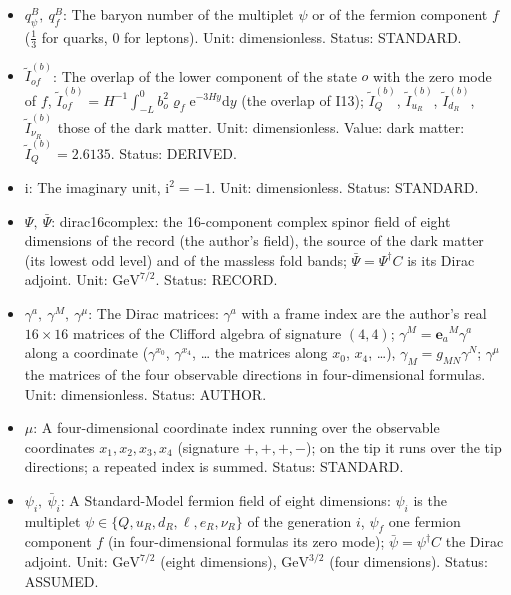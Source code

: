 \documentclass[
  10pt,
]{article}
\begin{document}
\begin{itemize}
  GeV\(^{-2}\) (dark-matter relic density). Status: DERIVED.
\item
  \(q^B_\psi,\ q^B_f\): The baryon number of the multiplet \(\psi\) or
  of the fermion component \(f\) (\(\frac13\) for quarks, 0 for
  leptons). Unit: dimensionless. Status: STANDARD.
\item
  \(\tilde I^{(b)}_{of}\): The overlap of the lower component of the
  state \(o\) with the zero mode of \(f\),
  \(\tilde I^{(b)}_{of} = H^{-1}\int_{-L}^{0}b_o^2\varrho_f\mathrm{e}^{-3Hy}\mathrm{d}y\)
  (the overlap of I13); \(\tilde I^{(b)}_Q\), \(\tilde I^{(b)}_{u_R}\),
  \(\tilde I^{(b)}_{d_R}\), \(\tilde I^{(b)}_{\nu_R}\) those of the dark
  matter. Unit: dimensionless. Value: dark matter:
  \(\tilde I^{(b)}_Q = 2.6135\). Status: DERIVED.
\item
  \(\mathrm{i}\): The imaginary unit, \(\mathrm{i}^2 = -1\). Unit:
  dimensionless. Status: STANDARD.
\item
  \(\Psi,\ \bar\Psi\): dirac16complex: the 16-component complex spinor
  field of eight dimensions of the record (the author's field), the
  source of the dark matter (its lowest odd level) and of the massless
  fold bands; \(\bar\Psi = \Psi^\dagger C\) is its Dirac adjoint. Unit:
  \(\mathrm{GeV}^{7/2}\). Status: RECORD.
\item
  \(\gamma^a,\ \gamma^M,\ \gamma^\mu\): The Dirac matrices: \(\gamma^a\)
  with a frame index are the author's real \(16 \times 16\) matrices of
  the Clifford algebra of signature \((4, 4)\);
  \(\gamma^M = \mathbf{e}_a{}^M\gamma^a\) along a coordinate
  (\(\gamma^{x_0}\), \(\gamma^{x_4}\), \ldots{} the matrices along
  \(x_0\), \(x_4\), \ldots), \(\gamma_M = g_{MN}\gamma^N\);
  \(\gamma^\mu\) the matrices of the four observable directions in
  four-dimensional formulas. Unit: dimensionless. Status: AUTHOR.
\item
  \(\mu\): A four-dimensional coordinate index running over the
  observable coordinates \(x_1, x_2, x_3, x_4\) (signature \(+,+,+,-\));
  on the tip it runs over the tip directions; a repeated index is
  summed. Status: STANDARD.
\item
  \(\psi_i,\ \bar\psi_i\): A Standard-Model fermion field of eight
  dimensions: \(\psi_i\) is the multiplet
  \(\psi \in \{Q, u_R, d_R, \ell, e_R, \nu_R\}\) of the generation
  \(i\), \(\psi_f\) one fermion component \(f\) (in four-dimensional
  formulas its zero mode); \(\bar\psi = \psi^\dagger C\) the Dirac
  adjoint. Unit: \(\mathrm{GeV}^{7/2}\) (eight dimensions),
  \(\mathrm{GeV}^{3/2}\) (four dimensions). Status: ASSUMED.

\end{itemize}
\end{document}
